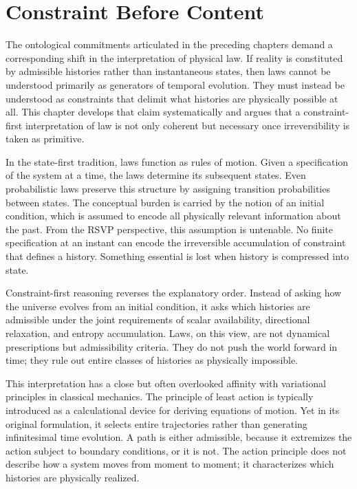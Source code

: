 \documentclass[11pt,oneside]{book}
\begin{document}
\chapter{Constraint Before Content}

The ontological commitments articulated in the preceding chapters demand a corresponding shift in the interpretation of physical law. If reality is constituted by admissible histories rather than instantaneous states, then laws cannot be understood primarily as generators of temporal evolution. They must instead be understood as constraints that delimit what histories are physically possible at all. This chapter develops that claim systematically and argues that a constraint-first interpretation of law is not only coherent but necessary once irreversibility is taken as primitive.

In the state-first tradition, laws function as rules of motion. Given a specification of the system at a time, the laws determine its subsequent states. Even probabilistic laws preserve this structure by assigning transition probabilities between states. The conceptual burden is carried by the notion of an initial condition, which is assumed to encode all physically relevant information about the past. From the RSVP perspective, this assumption is untenable. No finite specification at an instant can encode the irreversible accumulation of constraint that defines a history. Something essential is lost when history is compressed into state.

Constraint-first reasoning reverses the explanatory order. Instead of asking how the universe evolves from an initial condition, it asks which histories are admissible under the joint requirements of scalar availability, directional relaxation, and entropy accumulation. Laws, on this view, are not dynamical prescriptions but admissibility criteria. They do not push the world forward in time; they rule out entire classes of histories as physically impossible.

This interpretation has a close but often overlooked affinity with variational principles in classical mechanics. The principle of least action is typically introduced as a calculational device for deriving equations of motion. Yet in its original formulation, it selects entire trajectories rather than generating infinitesimal time evolution. A path is either admissible, because it extremizes the action subject to boundary conditions, or it is not. The action principle does not describe how a system moves from moment to moment; it characterizes which histories are physically realized.
\end{document}
